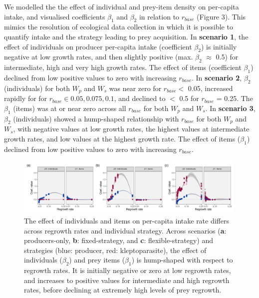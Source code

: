 \documentclass[11pt]{article}
\begin{document}
We modelled the the effect of individual and prey-item density on per-capita intake, and visualised coefficients $\beta_1$ and $\beta_2$ in relation to $r_{base}$ (Figure 3).
This mimics the resolution of ecological data collection in which it is possible to quantify intake and the strategy leading to prey acquisition.
In \textbf{scenario 1}, the effect of individuals on producer per-capita intake (coefficient $\beta_2$) is initially negative at low growth rates, and then slightly positive (max. $\beta_2$ $\approx$ 0.5) for intermediate, high and very high growth rates.
The effect of items (coefficient $\beta_1$) declined from low positive values to zero with increasing $r_{base}$.
In \textbf{scenario 2}, $\beta_2$ (individuals) for both $W_p$ and $W_s$ was near zero for $r_{base} <$ 0.05, increased rapidly for for $r_{base} \in 0.05, 0.075, 0.1$, and declined to $<$ 0.5 for $r_{base}$ = 0.25.
The $\beta_1$ (items) was at or near zero across all $r_{base}$ for both $W_p$ and $W_s$.
In \textbf{scenario 3}, $\beta_2$ (individuals) showed a hump-shaped relationship with $r_{base}$ for both $W_p$ and $W_s$, with negative values at low growth rates, the highest values at intermediate growth rates, and low values at the highest growth rate.
The effect of items ($\beta_1$) declined from low positive values to zero with increasing $r_{base}$.

\begin{figure}[h]
    \centering
    \includegraphics[width=0.99\textwidth]{figures/fig_05_coef_intake_general.png}
    \caption{
        The effect of individuals and items on per-capita intake rate differs across regrowth rates and individual strategy.
        Across scenarios (\textbf{a}: producers-only, \textbf{b}: fixed-strategy, and \textbf{c}: flexible-strategy) and strategies (blue: producer, red: kleptoparasite), the effect of individuals ($\beta_2$) and prey items ($\beta_1$) is hump-shaped with respect to regrowth rates.
        It is initially negative or zero at low regrowth rates, and increases to positive values for intermediate and high regrowth rates, before declining at extremely high levels of prey regrowth.
    }
\end{figure}
\end{document}
